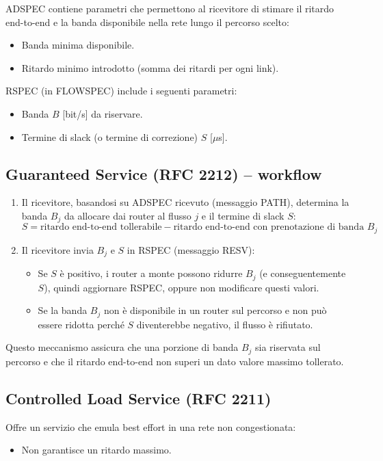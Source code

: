 ADSPEC contiene parametri che permettono al ricevitore di stimare il ritardo end-to-end e la banda disponibile nella rete lungo il percorso scelto:
\begin{itemize}
	\item Banda minima disponibile.
	\item Ritardo minimo introdotto (somma dei ritardi per ogni link).
\end{itemize}

RSPEC (in FLOWSPEC) include i seguenti parametri:
\begin{itemize}
	\item Banda $B$ [bit/s] da riservare.
	\item Termine di slack (o termine di correzione) $S$ [$\mu$s].
\end{itemize}

\subsection{Guaranteed Service (RFC 2212) – workflow}
\begin{enumerate}
	\item Il ricevitore, basandosi su ADSPEC ricevuto (messaggio PATH), determina la banda $B_j$ da allocare dai router al flusso $j$ e il termine di slack $S$:
	\[
	S = \text{ritardo end-to-end tollerabile} - \text{ritardo end-to-end con prenotazione di banda } B_j
	\]
	\item Il ricevitore invia $B_j$ e $S$ in RSPEC (messaggio RESV):
	\begin{itemize}
		\item Se $S$ è positivo, i router a monte possono ridurre $B_j$ (e conseguentemente $S$), quindi aggiornare RSPEC, oppure non modificare questi valori.
		\item Se la banda $B_j$ non è disponibile in un router sul percorso e non può essere ridotta perché $S$ diventerebbe negativo, il flusso è rifiutato.
	\end{itemize}
\end{enumerate}

Questo meccanismo assicura che una porzione di banda $B_j$ sia riservata sul percorso e che il ritardo end-to-end non superi un dato valore massimo tollerato.

\subsection{Controlled Load Service (RFC 2211)}
Offre un servizio che emula best effort in una rete non congestionata:
\begin{itemize}
	\item Non garantisce un ritardo massimo.
\end{itemize}

